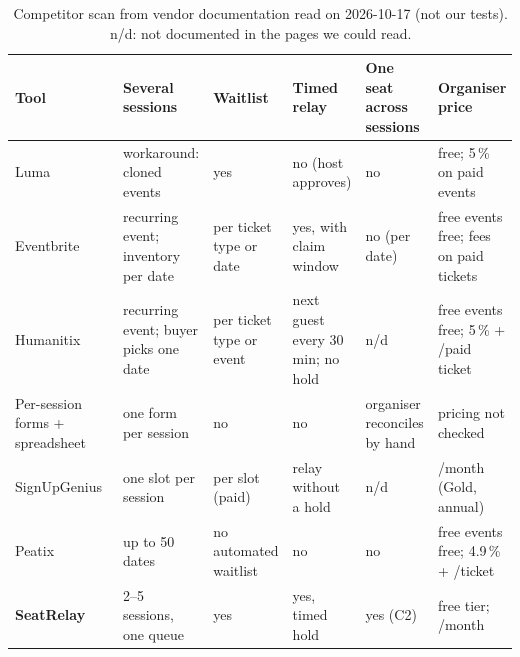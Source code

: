\begin{table}[t]
\centering\footnotesize
\caption{Competitor scan from vendor documentation read on 2026-10-17 (not our tests). n/d: not
documented in the pages we could read.}\label{tab:competitors}
\begin{tabularx}{\textwidth}{@{}P{2.45cm}P{3.0cm}P{2.2cm}P{2.75cm}P{2.15cm}L@{}}
\toprule
Tool & Several sessions & Waitlist & Timed relay & One seat across sessions & Organiser price\\
\midrule
Luma~\cite{luma-multisession,luma-waitlist,luma-pricing}
 & workaround: cloned events & yes & no (host approves) & no & free; 5\,\% on paid events\\
Eventbrite~\cite{eventbrite-multidate,eventbrite-waitlist,eventbrite-waitlist-feature,eventbrite-pricing-sg}
 & recurring event; inventory per date & per ticket type or date & yes, with claim window & no (per date) & free events free; fees on paid tickets\\
Humanitix~\cite{humanitix-recurring,humanitix-waitlist,humanitix-fees}
 & recurring event; buyer picks one date & per ticket type or event & next guest every 30\,min; no hold & n/d & free events free; 5\,\% + /paid ticket\\
Per-session forms + spreadsheet~\cite{google-forms-responses,ms-forms-settings}
 & one form per session & no & no & organiser reconciles by hand & pricing not checked\\
SignUpGenius~\cite{signupgenius-waitlist,signupgenius-pricing}
 & one slot per session & per slot (paid) & relay without a hold & n/d & /month (Gold, annual)\\
Peatix~\cite{peatix-recurring,peatix-waitlist,peatix-pricing-sg}
 & up to 50 dates & no automated waitlist & no & no & free events free; 4.9\,\% + /ticket\\
\textbf{SeatRelay} & 2--5 sessions, one queue & yes & yes, timed hold & yes (C2) & free tier; /month\\
\bottomrule
\end{tabularx}
\end{table}
